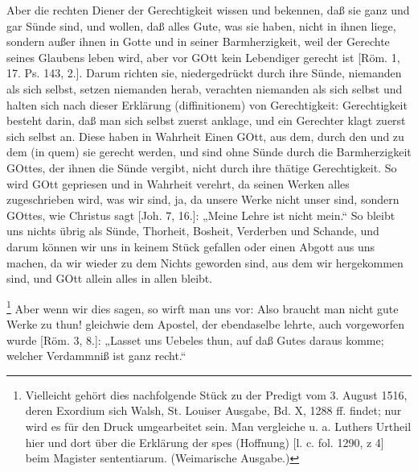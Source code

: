 Aber die rechten Diener der Gerechtigkeit wissen und bekennen, daß sie ganz und gar Sünde sind, und wollen, daß alles Gute, was sie haben, nicht in ihnen liege, sondern außer ihnen in Gotte und in seiner Barmherzigkeit, weil der Gerechte seines Glaubens leben wird, aber vor GOtt kein Lebendiger gerecht ist [Röm. 1, 17. Ps. 143, 2.]. Darum richten sie, niedergedrückt durch ihre Sünde, niemanden als sich selbst, setzen niemanden herab, verachten niemanden als sich selbst und halten sich nach dieser Erklärung (diffinitionem) von Gerechtigkeit: Gerechtigkeit besteht darin, daß man sich selbst zuerst anklage, und ein Gerechter klagt zuerst sich selbst an. Diese haben in Wahrheit Einen GOtt, aus dem, durch den und zu dem (in quem) sie gerecht werden, und sind ohne Sünde durch die Barmherzigkeit GOttes, der ihnen die Sünde vergibt, nicht durch ihre thätige Gerechtigkeit. So wird GOtt gepriesen und in Wahrheit verehrt, da seinen Werken alles zugeschrieben wird, was wir sind, ja, da unsere Werke nicht unser sind, sondern GOttes, wie Christus sagt [Joh. 7, 16.]: „Meine Lehre ist nicht mein.“ So bleibt uns nichts übrig als Sünde, Thorheit, Bosheit, Verderben und Schande, und darum können wir uns in keinem Stück gefallen oder einen Abgott aus uns machen, da wir wieder zu dem Nichts geworden sind, aus dem wir hergekommen
sind, und GOtt allein alles in allen bleibt.

\footnote{Vielleicht gehört dies nachfolgende Stück zu der Predigt vom 3. August 1516, deren Exordium sich Walsh, St. Louiser Ausgabe, Bd. X, 1288 ff. findet; nur wird es für den Druck umgearbeitet sein. Man vergleiche u. a. Luthers Urtheil hier und dort über die Erklärung der spes (Hoffnung) [l. c. fol. 1290, z 4] beim Magister sententiarum. (Weimarische Ausgabe.)} Aber wenn wir dies sagen, so wirft man uns vor: Also braucht man nicht gute Werke zu thun! gleichwie dem Apostel, der ebendaselbe lehrte, auch vorgeworfen wurde [Röm. 3, 8.]: „Lasset uns Uebeles thun, auf daß Gutes daraus komme; welcher Verdammniß ist ganz recht.“

